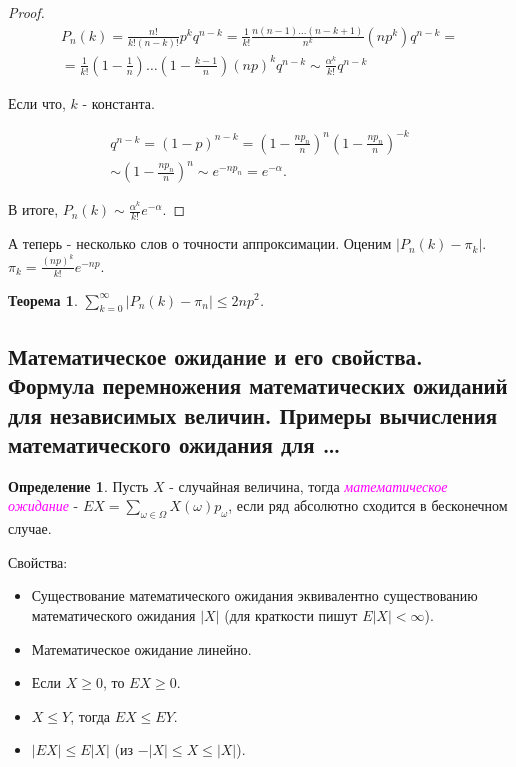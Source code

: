 \documentclass[a4paper,100pt]{article}
\theoremstyle{indented}
\newtheorem{theorem}{Теорема}
\theoremstyle{definition}
\newtheorem{defn}{Определение}
\theoremstyle{remark}
\begin{document}
\begin{proof}
  \begin{equation*}
      \begin{split}
          P_n(k)=\frac{n!}{k!(n-k)!}p^kq^{n-k}=\frac{1}{k!}\frac{n(n-1)\ldots(n-k+1)}{n^k}(np^k)q^{n-k}= \\ 
          = \frac{1}{k!}{(1-\frac{1}{n})\ldots(1-\frac{k-1}{n})}(np)^kq^{n-k}\sim\frac{\alpha^k}{k!}q^{n-k}
      \end{split}
  \end{equation*}

  Если что, $k$ - константа. 

  \begin{equation*}
      \begin{split}
          q^{n-k}=(1-p)^{n-k}=(1-\frac{n p_n}{n})^n(1-\frac{n p_n}{n})^{-k} \\ 
          \sim (1-\frac{n p_n}{n})^n \sim e^{-n p_n} = e^{-\alpha}. 
      \end{split}
  \end{equation*}

  В итоге, $P_n(k)\sim\frac{\alpha^k}{k!}e^{-\alpha}$. 

\end{proof}

А теперь - несколько слов о точности аппроксимации. Оценим $|P_n(k)-\pi_k|$. $\pi_k=\frac{(np)^k}{k!}e^{-np}$. \\

\begin{theorem}
  $\sum_{k=0}^\infty|P_n(k)-\pi_n|\leq 2np^2$.
\end{theorem}

\subsection{Математическое ожидание и его свойства. Формула перемножения математических ожиданий для независимых величин. Примеры вычисления математического ожидания для \ldots} 

\begin{defn}
  Пусть $X$ - случайная величина, тогда \hypertarget{n13}{\textcolor{magenta}{\textit{математическое ожидание}}} - $EX = \sum_{\omega \in \Omega} X(\omega)p_\omega$, если ряд абсолютно сходится в бесконечном случае.
\end{defn}

Свойства: \\ 

\begin{itemize}
  \item Существование математического ожидания эквивалентно существованию математического ожидания $|X|$ (для краткости пишут $E|X|<\infty$). 
  \item Математическое ожидание линейно.
  \item Если $X\geq 0$, то $EX\geq 0$. 
  \item $X\leq Y$, тогда $EX\leq EY$. 
  \item $|EX|\leq E|X|$ (из $-|X|\leq X \leq |X|$). 
\end{itemize}
\end{document}
